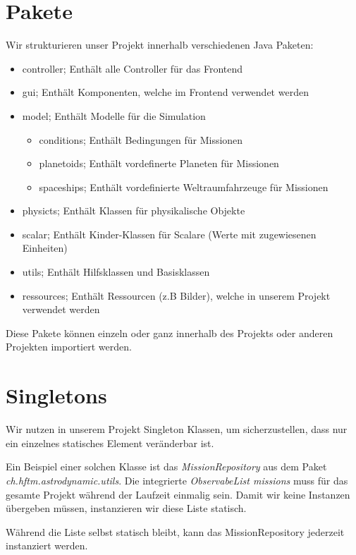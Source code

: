 \section{Pakete}

Wir strukturieren unser Projekt innerhalb verschiedenen Java Paketen:

\begin{itemize}
	\item controller; Enthält alle Controller für das Frontend
	\item gui; Enthält Komponenten, welche im Frontend verwendet werden
	\item model; Enthält Modelle für die Simulation
	\begin{itemize}
		\item conditions; Enthält Bedingungen für Missionen
		\item planetoids; Enthält vordefinerte Planeten für Missionen
		\item spaceships; Enthält vordefinierte Weltraumfahrzeuge für Missionen
	\end{itemize}
	\item physicts; Enthält Klassen für physikalische Objekte
	\item scalar; Enthält Kinder-Klassen für Scalare (Werte mit zugewiesenen Einheiten)
	\item utils; Enthält Hilfsklassen und Basisklassen
	\item ressources; Enthält Ressourcen (z.B Bilder), welche in unserem Projekt verwendet werden 
\end{itemize}

Diese Pakete können einzeln oder ganz innerhalb des Projekts oder anderen Projekten importiert werden.

\section{Singletons}

Wir nutzen in unserem Projekt Singleton Klassen, um sicherzustellen, dass nur ein einzelnes statisches Element veränderbar ist.

Ein Beispiel einer solchen Klasse ist das \textit{MissionRepository} aus dem Paket \textit{ch.hftm.astrodynamic.utils}.
Die integrierte \textit{ObservabeList missions} muss für das gesamte Projekt während der Laufzeit einmalig sein. Damit wir keine Instanzen übergeben müssen, instanzieren wir diese Liste statisch.

Während die Liste selbst statisch bleibt, kann das MissionRepository jederzeit instanziert werden.
